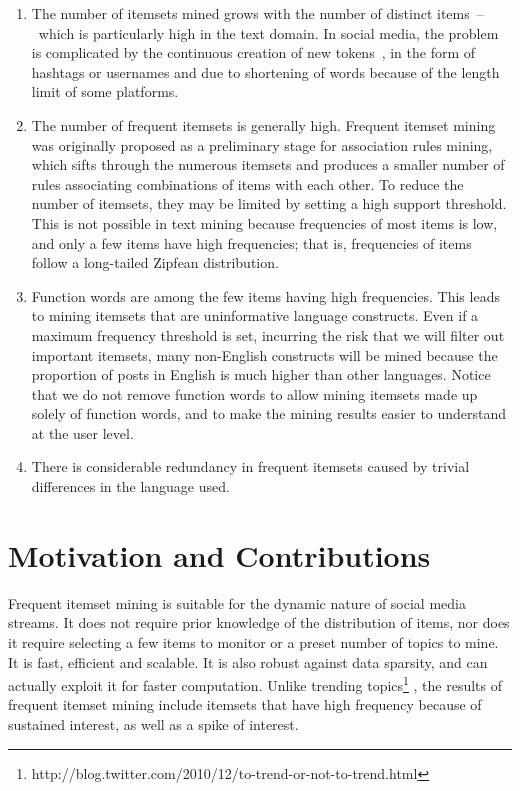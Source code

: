 \documentclass[letterpaper,12pt,titlepage,oneside,final]{book}
\begin{document}
\begin{enumerate}
\item
The number of itemsets mined grows with the number of
distinct items~--~which is particularly high in the text domain.
In social media, the problem is complicated by the continuous creation 
of new tokens~\cite{lin2012study}, in the form of hashtags or usernames
and due to shortening of words because of the length limit of some platforms.

\item
The number of frequent itemsets is generally high.
Frequent itemset mining was originally proposed as a preliminary stage for
association rules mining, which sifts through the numerous itemsets and
produces a smaller number of rules associating combinations of items with each other.
To reduce the number of itemsets, they may be limited by setting a high
support threshold. This is not possible in text mining because
frequencies of most items is low, and only a few items have high frequencies;
that is, frequencies of items follow a long-tailed Zipfean distribution.

\item
Function words are among the few items having high frequencies. 
This leads to mining itemsets that are uninformative language constructs.
Even if a maximum frequency threshold is set, incurring the risk that we
will filter out important itemsets, many  non-English constructs will be
mined because the proportion of posts in English is much higher than
other languages. 
Notice that we do not remove function words 
to allow mining itemsets made up solely of function words, 
and to make the mining results easier to understand at the user level.

\item
There is considerable redundancy in frequent
itemsets caused by trivial differences in the language used.
\end{enumerate}


\section{Motivation and Contributions}
Frequent itemset mining is suitable for the dynamic nature of social media streams.
It does not require prior knowledge of the distribution of items,
nor does it require selecting a few items to monitor 
or a preset number of topics to mine.
It is fast, efficient and scalable. 
It is also robust against data sparsity, 
and can actually exploit it for faster computation.
Unlike trending topics\footnote{http://blog.twitter.com/2010/12/to-trend-or-not-to-trend.html}
\cite{mathioudakis2010twittermonitor}, the results of frequent itemset
mining include itemsets that have high frequency because of sustained interest,
as well as a spike of interest.
\end{document}
